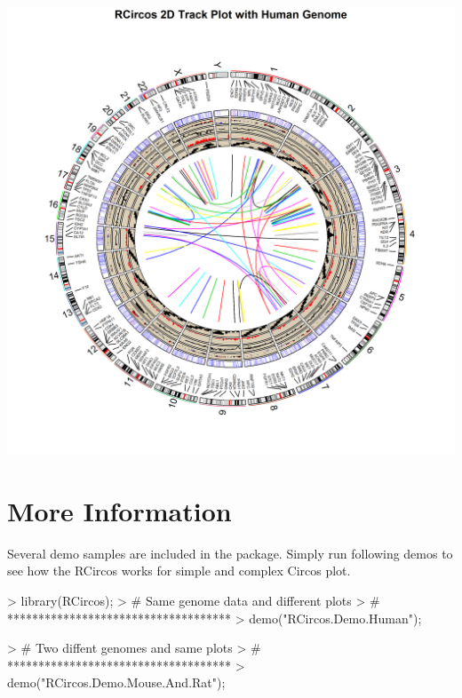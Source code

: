 \documentclass{article}
\begin{document}
\includegraphics[width=1\textwidth]{RCircosDemoHuman.png}


\section{More Information}

Several demo samples are included in the package. Simply run following demos to see how the RCircos works for simple and complex Circos plot.

\begin{Schunk}
\begin{Sinput}
> library(RCircos);
> #	Same genome data and different plots
> #	************************************
> demo("RCircos.Demo.Human");
\end{Sinput}
\end{Schunk}

\begin{Schunk}
\begin{Sinput}
> #	Two diffent genomes and same plots
> #	************************************
> demo("RCircos.Demo.Mouse.And.Rat");
\end{Sinput}
\end{Schunk}
\end{document}
